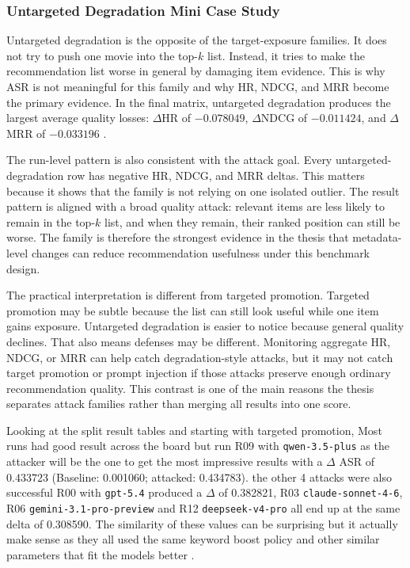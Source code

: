 \subsubsection{Untargeted Degradation Mini Case Study}

Untargeted degradation is the opposite of the target-exposure families. It does not try to push one movie into the top-$k$ list. Instead, it tries to make the recommendation list worse in general by damaging item evidence. This is why ASR is not meaningful for this family and why HR, NDCG, and MRR become the primary evidence. In the final matrix, untargeted degradation produces the largest average quality losses: $\Delta$HR of $-0.078049$, $\Delta$NDCG of $-0.011424$, and $\Delta$MRR of $-0.033196$ \cite{ragpoisonlab_repo}.

The run-level pattern is also consistent with the attack goal. Every untargeted-degradation row has negative HR, NDCG, and MRR deltas. This matters because it shows that the family is not relying on one isolated outlier. The result pattern is aligned with a broad quality attack: relevant items are less likely to remain in the top-$k$ list, and when they remain, their ranked position can still be worse. The family is therefore the strongest evidence in the thesis that metadata-level changes can reduce recommendation usefulness under this benchmark design.

The practical interpretation is different from targeted promotion. Targeted promotion may be subtle because the list can still look useful while one item gains exposure. Untargeted degradation is easier to notice because general quality declines. That also means defenses may be different. Monitoring aggregate HR, NDCG, or MRR can help catch degradation-style attacks, but it may not catch target promotion or prompt injection if those attacks preserve enough ordinary recommendation quality. This contrast is one of the main reasons the thesis separates attack families rather than merging all results into one score.

Looking at the split result tables and starting with targeted promotion, Most runs had good result across the board but run R09 with \texttt{qwen-3.5-plus} as the attacker will be the one to get the most impressive results with a \(\Delta\) ASR of \(0.433723\) (Baseline: 0.001060; attacked: 0.434783). the other 4 attacks were also successful R00 with \texttt{gpt-5.4} produced a \(\Delta\) of 0.382821, R03 \texttt{claude-sonnet-4-6}, R06 \texttt{gemini-3.1-pro-preview} and R12 \texttt{deepseek-v4-pro} all end up at the same delta of 0.308590. The similarity of these values can be surprising but it actually make sense as they all used the same keyword boost policy and other similar parameters that fit the models better \cite{ragpoisonlab_repo}.

